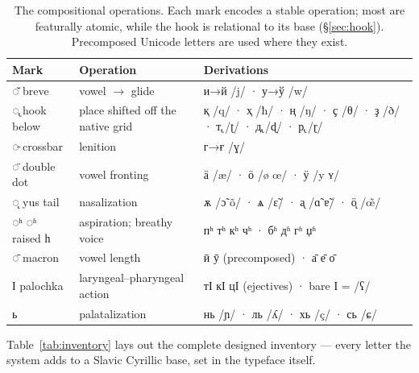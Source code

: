 \documentclass[11pt]{article}
\newcommand{\cz}[1]{{\chu #1}}
\newcommand{\ph}[1]{{\ipafont/#1/}}
\begin{document}
\begin{table}[ht]\centering\small
\begin{tabular}{lll}
\toprule
Mark & Operation & Derivations \\
\midrule
\cz{◌̆} breve & vowel $\rightarrow$ glide & \cz{и→й} \ph{j} · \cz{у→ў} \ph{w} \\
\cz{◌̢} hook below & place shifted off the native grid & \cz{қ} \ph{q} · \cz{ҳ} \ph{ħ} · \cz{ң} \ph{ŋ} · \cz{ҫ} \ph{θ} · \cz{ҙ} \ph{ð} · \cz{т̢} \ph{ʈ} · \cz{д̢} \ph{ɖ} · \cz{р̢} \ph{ɽ} \\
\cz{◌̵} crossbar & lenition & \cz{г→ғ} \ph{ɣ} \\
\cz{◌̈} double dot & vowel fronting & \cz{ӓ} \ph{æ} · \cz{ӧ} \ph{ø œ} · \cz{ӱ} \ph{y ʏ} \\
\cz{◌̨} yus tail & nasalization & \cz{ѫ} \ph{ɔ̃ õ} · \cz{ѧ} \ph{ɛ̃} · \cz{а̨} \ph{ɑ̃ ɐ̃} · \cz{ӧ̨} \ph{œ̃} \\
\cz{◌ʰ ◌ʱ} raised \cz{һ} & aspiration; breathy voice & \cz{пʰ тʰ кʰ чʰ} · \cz{бʱ дʱ гʱ џʱ} \\
\cz{◌̄} macron & vowel length & \cz{ӣ ӯ} (precomposed) · \cz{а̄ е̄ о̄} \\
\cz{Ӏ} palochka & laryngeal--pharyngeal action & \cz{тӀ кӀ цӀ} (ejectives) · bare \cz{Ӏ} = \ph{ʕ} \\
\cz{ь} & palatalization & \cz{нь} \ph{ɲ} · \cz{ль} \ph{ʎ} · \cz{хь} \ph{ç} · \cz{сь} \ph{ɕ} \\
\bottomrule
\end{tabular}
\caption{The compositional operations. Each mark encodes a stable operation; most are featurally atomic, while the hook is relational to its base (\S\ref{sec:hook}). Precomposed Unicode letters are used where they exist.}
\label{tab:grammar}
\end{table}


Table~\ref{tab:inventory} lays out the complete designed inventory — every letter the system adds to a Slavic Cyrillic base, set in the typeface itself.
\end{document}
